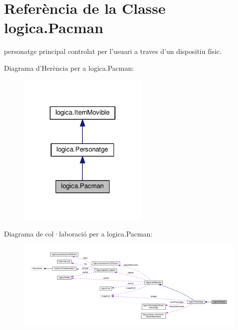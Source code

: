 \hypertarget{classlogica_1_1_pacman}{\section{Referència de la Classe logica.\+Pacman}
\label{classlogica_1_1_pacman}
}


personatge principal controlat per l'usuari a traves d'un dispositiu físic.  




Diagrama d'Herència per a logica.\+Pacman\+:\nopagebreak
\begin{figure}[H]
\begin{center}
\leavevmode
\includegraphics[width=178pt]{classlogica_1_1_pacman__inherit__graph}
\end{center}
\end{figure}


Diagrama de col·laboració per a logica.\+Pacman\+:
\nopagebreak
\begin{figure}[H]
\begin{center}
\leavevmode
\includegraphics[width=350pt]{classlogica_1_1_pacman__coll__graph}
\end{center}
\end{figure}
